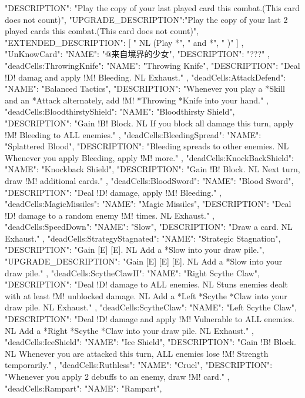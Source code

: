 {{    "DESCRIPTION": "Play the copy of your last played card this combat.(This card does not count)",
    "UPGRADE_DESCRIPTION":"Play the copy of your last 2 played cards this combat.(This card does not count)",
    "EXTENDED_DESCRIPTION": [
      " NL (Play *",
      " and *",
      " )"
    ]
  },
  "UnKnowCard": {
    "NAME": "@来自境界的少女",
    "DESCRIPTION": "???"
  },
  "deadCells:ThrowingKnife": {
    "NAME": "Throwing Knife",
    "DESCRIPTION": "Deal !D! damag and apply !M! Bleeding. NL Exhaust."
  },
  "deadCells:AttackDefend": {
    "NAME": "Balanced Tactics",
    "DESCRIPTION": "Whenever you play a *Skill and an *Attack alternately, add !M! *Throwing *Knife into your hand."
  },
  "deadCells:BloodthirstyShield": {
    "NAME": "Bloodthirsty Shield",
    "DESCRIPTION": "Gain !B! Block. NL If you block all damage this turn, apply !M! Bleeding to ALL enemies."
  },
  "deadCells:BleedingSpread": {
    "NAME": "Splattered Blood",
    "DESCRIPTION": "Bleeding spreads to other enemies. NL Whenever you apply Bleeding, apply !M! more."
  },
  "deadCells:KnockBackShield":{
    "NAME": "Knockback Shield",
    "DESCRIPTION": "Gain !B! Block. NL Next turn, draw !M! additional cards."
  },
  "deadCells:BloodSword": {
    "NAME": "Blood Sword",
    "DESCRIPTION": "Deal !D! damage, apply !M! Bleeding."
  },
  "deadCells:MagicMissiles": {
    "NAME": "Magic Missiles",
    "DESCRIPTION": "Deal !D! damage to a random enemy !M! times. NL Exhaust."
  },
  "deadCells:SpeedDown": {
    "NAME": "Slow",
    "DESCRIPTION": "Draw a card. NL Exhaust."
  },
  "deadCells:StrategyStagnated":{
    "NAME": "Strategic Stagnation",
    "DESCRIPTION": "Gain [E] [E]. NL Add a *Slow into your draw pile.",
    "UPGRADE_DESCRIPTION": "Gain [E] [E] [E]. NL Add a *Slow into your draw pile."
  },
  "deadCells:ScytheClawII": {
    "NAME": "Right Scythe Claw",
    "DESCRIPTION": "Deal !D! damage to ALL enemies. NL Stuns enemies dealt with at least !M! unblocked damage. NL Add a *Left *Scythe *Claw into your draw pile. NL Exhaust."
  },
  "deadCells:ScytheClaw": {
    "NAME": "Left Scythe Claw",
    "DESCRIPTION": "Deal !D! damage and apply !M! Vulnerable to ALL enemies. NL Add a *Right *Scythe *Claw into your draw pile. NL Exhaust."
  },
  "deadCells:IceShield": {
    "NAME": "Ice Shield",
    "DESCRIPTION": "Gain !B! Block. NL Whenever you are attacked this turn, ALL enemies lose !M! Strength temporarily."
  },
  "deadCells:Ruthless": {
    "NAME": "Cruel",
    "DESCRIPTION": "Whenever you apply 2 debuffs to an enemy, draw !M! card."
  },
  "deadCells:Rampart": {
    "NAME": "Rampart",
}}

